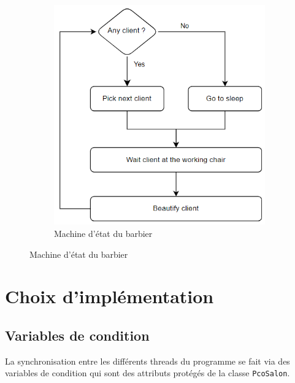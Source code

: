 \documentclass{article}
\begin{document}
\begin{figure}
\begin{subfigure}[b]{0.4\textwidth}
        \includegraphics[width=\textwidth]{figures/machine_etat_barbier.png}
        \caption{Machine d'état du barbier}
        \label{fig:machine état barbier}
    \end{subfigure}
\end{figure}

\section*{Choix d'implémentation}

\subsection*{Variables de condition}

La synchronisation entre les différents threads du programme se fait via des variables de condition qui sont des attributs
protégés de la classe \texttt{PcoSalon}.
\end{document}
